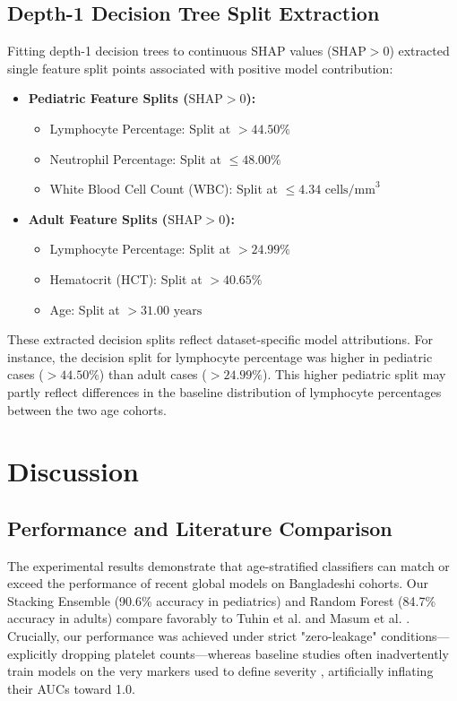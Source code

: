 \documentclass[conference]{IEEEtran}
\begin{document}
\subsection{Depth-1 Decision Tree Split Extraction}
Fitting depth-1 decision trees to continuous SHAP values ($\text{SHAP} > 0$) extracted single feature split points associated with positive model contribution:
\begin{itemize}
    \item \textbf{Pediatric Feature Splits ($\text{SHAP} > 0$):}
    \begin{itemize}
        \item Lymphocyte Percentage: Split at $> 44.50\%$
        \item Neutrophil Percentage: Split at $\le 48.00\%$
        \item White Blood Cell Count (WBC): Split at $\le 4.34 \text{ cells/mm}^3$
    \end{itemize}
    \item \textbf{Adult Feature Splits ($\text{SHAP} > 0$):}
    \begin{itemize}
        \item Lymphocyte Percentage: Split at $> 24.99\%$
        \item Hematocrit (HCT): Split at $> 40.65\%$
        \item Age: Split at $> 31.00 \text{ years}$
    \end{itemize}
\end{itemize}

These extracted decision splits reflect dataset-specific model attributions. For instance, the decision split for lymphocyte percentage was higher in pediatric cases ($> 44.50\%$) than adult cases ($> 24.99\%$). This higher pediatric split may partly reflect differences in the baseline distribution of lymphocyte percentages between the two age cohorts.

\section{Discussion}

\subsection{Performance and Literature Comparison}
The experimental results demonstrate that age-stratified classifiers can match or exceed the performance of recent global models on Bangladeshi cohorts. Our Stacking Ensemble (90.6\% accuracy in pediatrics) and Random Forest (84.7\% accuracy in adults) compare favorably to Tuhin et al. \cite{tuhin2025} and Masum et al. \cite{masum2025}. Crucially, our performance was achieved under strict "zero-leakage" conditions—explicitly dropping platelet counts—whereas baseline studies often inadvertently train models on the very markers used to define severity \cite{niazi2026, das2025}, artificially inflating their AUCs toward 1.0. 
\end{document}
